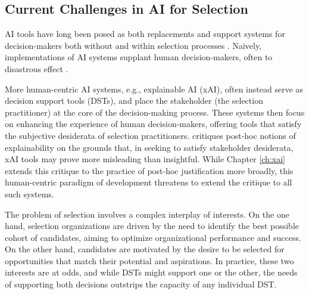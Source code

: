 

\subsection{Current Challenges in AI for Selection}
AI tools have long been posed as both replacements and support systems for decision-makers both without and within selection processes \cite{barocas_big_2016,jacobs_how_2021,hildebrandt_law_nodate,yarger2020algorithmic,mattu_how_nodate}. Naively, implementations of AI systems supplant human decision-makers, often to disastrous effect \cite{mattu_how_nodate}.

More human-centric AI systems, e.g., explainable AI (xAI), often instead serve as decision support tools (DSTs), and place the stakeholder (the selection practitioner) at the core of the decision-making process. These systems then focus on enhancing the experience of human decision-makers, offering tools that satisfy the subjective desiderata of selection practitioners. \textcite{Lipton} critiques post-hoc notions of explainability on the grounds that, in seeking to satisfy stakeholder desiderata, xAI tools may prove more misleading than insightful. While Chapter \ref{ch:xai} extends this critique to the practice of post-hoc justification more broadly, this human-centric paradigm of development threatens to extend the critique to all such systems.

The problem of selection involves a complex interplay of interests. On the one hand, selection organizations are driven by the need to identify the best possible cohort of candidates, aiming to optimize organizational performance and success. On the other hand, candidates are motivated by the desire to be selected for opportunities that match their potential and aspirations. In practice, these two interests are at odds, and while DSTs might support one or the other, the needs of supporting both decisions outstrips the capacity of any individual DST. %

